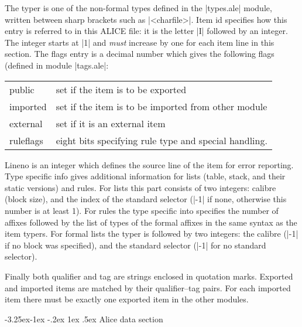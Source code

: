\documentclass[titlepage]{article}
\makeatletter
\newcommand\I{\textsf{ALICE}}
\newcommand\g[1]{\textsf{#1}}
\renewcommand\subsection{%
\@startsection{subsection}{2}{\z@}%
   {-3.25ex\@plus -1ex \@minus -.2ex}%
   {1ex \@plus .5ex}%
   {\normalfont\normalsize\bfseries}}
\makeatother
\begin{document}
\noindent
The \g{typer} is one of the non-formal types defined in the \pp|types.ale|
module, written between sharp brackets such as \pp|<charfile>|. \g{Item id}
specifies how this entry is referred to in this \I{} file: it is 
the letter \pp|I| followed by an integer. The integer starts at \pp|1| and
\emph{must} increase by one for each item line in this section.
%
The \g{flags} entry is a decimal number which gives the following flags
(defined in module \pp|tags.ale|:
\begin{center}\begin{tabular}{ll}
\g{public} & set if the item is to be exported \\
\g{imported}& set if the item is to be imported from other module \\
\g{external}& set if it is an external item \\
\g{ruleflags}& eight bits specifying rule type and special handling.
\end{tabular}\end{center}

\g{Lineno} is an integer which defines the source line of the item for error
reporting. \g{Type specific info} gives additional information for lists
(\g{table}, \g{stack}, and their static versions) and rules. For lists this
part consists of two integers: calibre (block size), and the index of the
standard selector (\pp|-1| if none, otherwise this number is at least 1).
For rules the \g{type specific into} specifies the number of affixes
followed by the list of types of the formal affixes in the same syntax as
the item \g{typer}s. For formal lists the typer is followed by two integers:
the calibre (\pp|-1| if no block was specified), and the standard selector
(\pp|-1| for no standard selector).

Finally both \g{qualifier} and \g{tag} are strings enclosed in quotation
marks. Exported and imported items are matched by their qualifier--tag
pairs. For each imported item there must be exactly one exported item in the
other modules.

\subsection{Alice data section}\label{alice:data}
\end{document}
